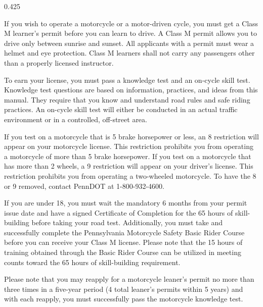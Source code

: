 




\begin{langblock}{0.425}
	\begin{eng}
	
	If you wish to operate a motorcycle or a motor-driven cycle, you must get a Class M learner's permit before you can learn to drive. A Class M permit allows you to drive only between sunrise and sunset. All applicants with a permit must wear a helmet and eye protection. Class M learners shall not carry any passengers other than a properly licensed instructor.
	
	To earn your license, you must pass a knowledge test and an on-cycle skill test.  Knowledge test questions are based on information, practices, and ideas from this manual. They require that you know and understand road rules and safe riding practices. An on-cycle skill test will either be conducted in an actual traffic environment or in a controlled, off-street area.
	
	If you test on a motorcycle that is 5 brake horsepower or less, an 8 restriction will appear on your motorcycle license. This restriction prohibits you from operating a motorcycle of more than 5 brake horsepower. If you test on a motorcycle that has more than 2 wheels, a 9 restriction will appear on your driver's license. This restriction prohibits you from operating a two-wheeled motorcycle. To have the 8 or 9 removed, contact PennDOT at 1-800-932-4600.
	
	If you are under 18, you must wait the mandatory 6 months from your permit issue date and have a signed Certificate of Completion for the 65 hours of skill- building before taking your road test. Additionally, you must take and successfully complete the Pennsylvania Motorcycle Safety Basic Rider Course before you can receive your Class M license. Please note that the 15 hours of training obtained through the Basic Rider Course can be utilized in meeting counts toward the 65 hours of skill-building requirement.
	
	Please note that you may reapply for a motorcycle leaner's permit no more than three times in a five-year period (4 total leaner's permits within 5 years) and with each reapply, you must successfully pass the motorcycle knowledge test.
	\end{eng}
	\begin{rus}
		

\end{rus}
\end{langblock}

